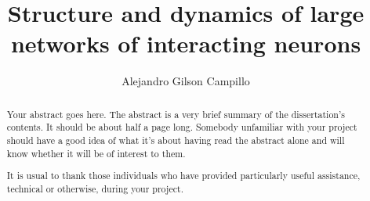 \documentclass[a4paper, twoside]{report}
\title{Structure and dynamics of large networks of interacting neurons}
\author{Alejandro Gilson Campillo}
\begin{document}


\begin{abstract}
Your abstract goes here. The abstract is a very brief summary of the dissertation's contents. It should be about half a page long. Somebody unfamiliar with your project should have a good idea of what it's about having read the abstract alone and will know whether it will be of interest to them.
\end{abstract}

\renewcommand{\abstractname}{Acknowledgements}
\begin{abstract}
It is usual to thank those individuals who have provided particularly useful assistance, technical or otherwise, during your project.
\end{abstract}

\tableofcontents
\listoffigures
\listoftables










\printbibliography 
% 
% 
\end{document}
